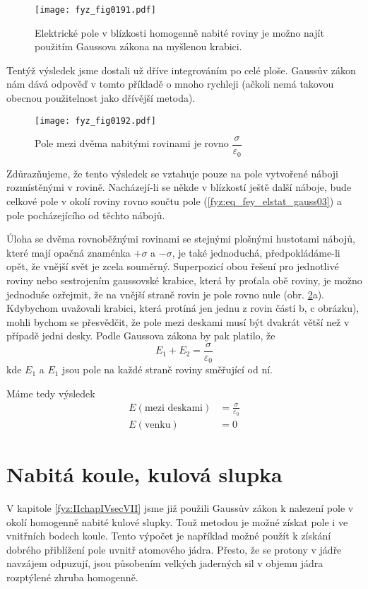   \begin{figure}[ht!] %
    \centering
    \texttt{[image: fyz\_fig0191.pdf]}
    \caption{Elektrické pole v blízkosti homogenně nabité roviny je možno najít použitím   
             Gaussova zákona na myšlenou krabici.}
    \label{fyz:fig0191}
  \end{figure}
  
  Tentýž výsledek jsme dostali už dříve integrováním po celé ploše. Gaussův zákon nám dává odpověď v
  tomto příkladě o mnoho rychleji (ačkoli nemá takovou obecnou použitelnost jako dřívější metoda).

  \begin{figure}[ht!]  %
    \centering
    \texttt{[image: fyz\_fig0192.pdf]}
    \caption{Pole mezi dvěma nabitými rovinami je rovno \(\dfrac{\sigma}{\varepsilon_0}\)}
    \label{fyz:fig0192}
  \end{figure}
  Zdůrazňujeme, že tento výsledek se vztahuje pouze na pole vytvořené náboji rozmístěnými v rovině.
  Nacházejí-li se někde v blízkostí ještě další náboje, bude celkové pole v okolí roviny rovno
  součtu pole (\ref{fyz:eq_fey_elstat_gauss03}) a pole pocházejícího od těchto nábojů.
   
  Úloha se dvěma rovnoběžnými rovinami se stejnými plošnými hustotami nábojů, které mají opačná
  znaménka \(+\sigma\) a \(-\sigma\), je také jednoduchá, předpokládáme-li opět, že vnější svět je
  zcela souměrný. Superpozicí obou řešení pro jednotlivé roviny nebo sestrojením gaussovské krabice,
  která by proťala obě roviny, je možno jednoduše ozřejmit, že na vnější straně rovin je pole rovno
  nule (obr. \ref{fyz:fig0192}a). Kdybychom uvažovali krabici, která protíná jen jednu z rovin částí
  b, c obrázku), mohli bychom se přesvědčit, že pole mezi deskami musí být dvakrát větší než v
  případě jedni desky. Podle Gaussova zákona by pak platilo, že
  \begin{equation}\label{fyz:eq_fey_elstat_gauss04}
    E_1 + E_2 = \frac{\sigma}{\varepsilon_0}
  \end{equation}
  kde \(E_1\) a \(E_1\) jsou pole na každé straně roviny směřující od ní.

  Máme tedy výsledek
  \begin{align}
    E (\text{mezi deskami}) &= \frac{\sigma}{\varepsilon_0} \\
    E (\text{venku})        &= 0  
  \end{align}
  
\section{Nabitá koule, kulová slupka}\label{fyz:IIchapVsecVI}
  V kapitole \ref{fyz:IIchapIVsecVII} jsme již použili Gaussův zákon k nalezení pole v okolí
  homogenně nabité kulové slupky. Touž metodou je možné získat pole i ve vnitřních bodech koule.
  Tento výpočet je například možné použít k získání dobrého přiblížení pole uvnitř atomového jádra.
  Přesto, že se protony v jádře navzájem odpuzují, jsou působením velkých jaderných sil v objemu
  jádra rozptýlené zhruba homogenně.

